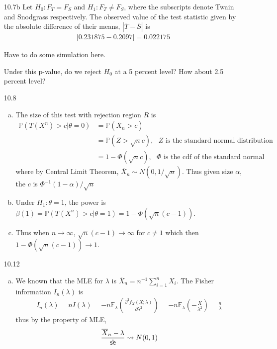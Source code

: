 \documentclass[a4paper,10pt]{article}
\theoremstyle{definition}
\begin{document}
\begin{enumerate}
\item[10.7b] 
Let $H_0: F_T = F_S$ and $H_1: F_T \neq F_S$, where the subscripts denote Twain and Snodgrass respectively. The observed value of the test statistic given by the absolute difference of their means, $|\overline{T} - \overline{S}|$ is 
\begin{align*}
|0.231875 - 0.2097 |=0.022175
\end{align*}
\begin{python}
Have to do some simulation here.
\end{python}
Under this p-value, do we reject $H_0$ at a 5 percent level? How about 2.5 percent level?
\item[10.8]
\begin{enumerate}[(a)]
\item The size of this test with rejection region $R$ is
\begin{align*}
\mathbb{P}(T(X^n)>c| \theta = 0) & = \mathbb{P}(\overline{X}_n > c)\\
& = \mathbb{P}\left(Z > \sqrt{n}c\right), \text{ $Z$ is the standard normal distribution}\\
&= 1- \Phi(\sqrt{n}c), \text{ $\Phi$ is the cdf of the standard normal}
\end{align*}
where by Central Limit Theorem, $\overline{X}_n\sim N(0,1/\sqrt{n})$. Thus given size $\alpha$, the $c$ is $\Phi^{-1}(1-\alpha)/\sqrt{n}$
\item Under $H_1: \theta = 1$, the power is $\beta(1) = \mathbb{P}(T(X^n)>c| \theta = 1) = 1- \Phi\left(\sqrt{n}(c-1)\right)$. 
\item Thus when $n \to \infty$, $\sqrt{n}(c-1)\to \infty$ for $c \neq 1$ which then $1- \Phi\left(\sqrt{n}(c-1)\right) \to 1$.
\end{enumerate}
\item[10.12]
\begin{enumerate}[(a)]
\item We known that the {\sffamily MLE} for $\lambda$ is $\overline{X}_n = n^{-1}\sum_{i=1}^{n}X_i$. The Fisher information $I_n(\lambda)$ is 
\begin{align*}
I_n(\lambda) = nI(\lambda)=-n\mathbb{E}_\lambda\left(\frac{\partial^2 f_X(X;\lambda)}{\partial \lambda^2}\right) = -n\mathbb{E}_\lambda\left(-\frac{X}{\lambda^2}\right)=\frac{n}{\lambda}
\end{align*}
thus by the property of  {\sffamily MLE}, 
\begin{align*}
\frac{\overline{X}_n-\lambda}{\hat{\text{\sffamily se}}} \leadsto N(0,1)
\end{align*}

\end{enumerate}
\end{enumerate}
\end{document}

